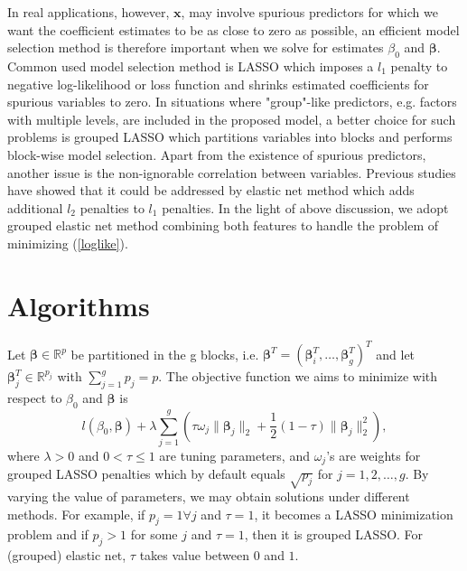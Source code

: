 \documentclass[paper=a4, fontsize=11pt]{scrartcl} %
\begin{document}
In real applications, however, $\boldsymbol{x}$, may involve spurious predictors for which we want the coefficient estimates to be as close to zero as possible, an efficient model selection method is therefore important when we solve for estimates $\beta_{0}$ and $\boldsymbol{\beta}$. Common used model selection method is LASSO which imposes a $l_{1}$ penalty to negative log-likelihood or loss function and shrinks estimated coefficients for spurious variables to zero. In situations where "group"-like predictors, e.g. factors with multiple levels, are included in the proposed model, a better choice for such problems is grouped LASSO which partitions variables into blocks and performs block-wise model selection. Apart from the existence of spurious predictors, another issue is the non-ignorable correlation between variables. Previous studies have showed that it could be addressed by elastic net method which adds additional $l_{2}$ penalties to $l_{1}$ penalties. In the light of above discussion, we adopt grouped elastic net method combining both features to handle the problem of minimizing (\ref{loglike}).\\

\section*{\textbf{Algorithms}}
Let $\boldsymbol{\beta}\in\mathbb{R}^{p}$ be partitioned in the g blocks, i.e. $\boldsymbol{\beta}^{T}=(\boldsymbol{\beta}_{i}^{T},\dots,\boldsymbol{\beta}_{g}^{T})^{T}$ and let $\boldsymbol{\beta}_{j}^{T}\in\mathbb{R}^{p_{j}}$ with $\sum_{j=1}^{g}p_{j}=p$. The objective function we aims to minimize with respect to $\beta_{0}$ and $\boldsymbol{\beta}$ is
\begin{equation}\label{objfunc}
l(\beta_{0},\boldsymbol{\beta})+\lambda\sum_{j=1}^{g}(\tau\omega_{j}\|\boldsymbol{\beta}_{j}\|_{2}+\frac{1}{2}(1-\tau)\|\boldsymbol{\beta}_{j}\|_{2}^{2}),
\end{equation}
where $\lambda>0$ and $0<\tau\le1$ are tuning parameters, and $\omega_{j}$'s are weights for grouped LASSO penalties which by default equals $\sqrt{p_{j}}$ for $j=1,2,\dots,g$. By varying the value of parameters, we may obtain solutions under different methods. For example, if $p_{j}=1 \forall j$ and $\tau=1$, it becomes a LASSO minimization problem and if $p_{j}>1$ for some $j$ and $\tau=1$, then it is grouped LASSO. For (grouped) elastic net, $\tau$ takes value between $0$ and $1$.\\
\end{document}
